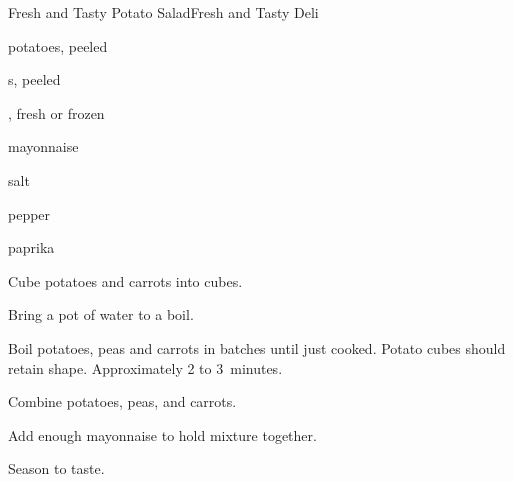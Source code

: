 \begin{recipe}{Fresh and Tasty Potato Salad}{Fresh and Tasty Deli}{}

\begin{ingredients}
\item potatoes, peeled
\item {}s, peeled
\item {}, fresh or frozen
\item mayonnaise
\item salt
\item pepper
\item paprika
\end{ingredients}

\begin{directions}
\item Cube potatoes and carrots into \inch{\half} cubes.
\item Bring a pot of water to a boil.
\item Boil potatoes, peas and carrots in batches until just cooked. Potato cubes should retain shape. Approximately 2 to 3~minutes.
\item Combine potatoes, peas, and carrots.
\item Add enough mayonnaise to hold mixture together.
\item Season to taste.
\end{directions}

\end{recipe}
